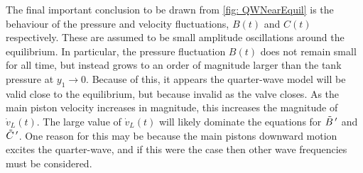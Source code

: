 The final important conclusion to be drawn from \cref{fig: QWNearEquil} is the behaviour of the pressure and velocity fluctuations, $B(t)$ and $C(t)$ respectively. These are assumed to be small amplitude oscillations around the equilibrium. In particular, the pressure fluctuation $B(t)$ does not remain small for all time, but instead grows to an order of magnitude larger than the tank pressure at $y_1 \rightarrow 0$. Because of this, it appears the quarter-wave model will be valid close to the equilibrium, but because invalid as the valve closes. As the main piston velocity increases in magnitude, this increases the magnitude of $\dot{v}_L(t)$. The large value of $\dot{v}_L(t)$ will likely dominate the equations for $\tilde{B} \,{'}$ and $\tilde{C} \,{'}$. One reason for this may be because the main pistons downward motion excites the quarter-wave, and if this were the case then other wave frequencies must be considered.